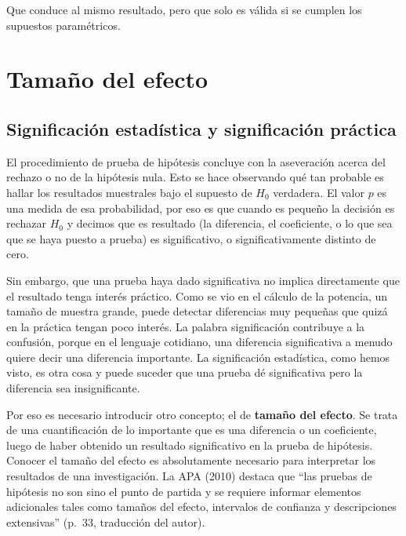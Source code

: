 \documentclass[]{book}
\begin{document}
Que conduce al mismo resultado, pero que solo es válida si se cumplen los supuestos paramétricos.

\hypertarget{tamauxf1o-del-efecto}{%
\chapter{Tamaño del efecto}\label{tamauxf1o-del-efecto}}

\hypertarget{significaciuxf3n-estaduxedstica-y-significaciuxf3n-pruxe1ctica}{%
\section{Significación estadística y significación práctica}\label{significaciuxf3n-estaduxedstica-y-significaciuxf3n-pruxe1ctica}}

El procedimiento de prueba de hipótesis concluye con la aseveración
acerca del rechazo o no de la hipótesis nula. Esto se hace observando
qué tan probable es hallar los resultados muestrales bajo el supuesto de
\(H_0\) verdadera. El valor \(p\) es una medida de esa probabilidad, por eso es
que cuando es pequeño la decisión es rechazar \(H_0\) y decimos que es
resultado (la diferencia, el coeficiente, o lo que sea que se haya
puesto a prueba) es significativo, o significativamente distinto de
cero.

Sin embargo, que una prueba haya dado significativa no implica
directamente que el resultado tenga interés práctico. Como se vio en el
cálculo de la potencia, un tamaño de muestra grande, puede detectar
diferencias muy pequeñas que quizá en la práctica tengan poco interés.
La palabra significación contribuye a la confusión, porque en el
lenguaje cotidiano, una diferencia significativa a menudo quiere decir
una diferencia importante. La significación estadística, como hemos
visto, es otra cosa y puede suceder que una prueba dé significativa pero
la diferencia sea insignificante.

Por eso es necesario introducir otro concepto; el de \textbf{tamaño del efecto}. Se trata de una cuantificación de lo importante que es una
diferencia o un coeficiente, luego de haber obtenido un resultado
significativo en la prueba de hipótesis. Conocer el tamaño del efecto es
absolutamente necesario para interpretar los resultados de una
investigación. La APA (2010) destaca que ``las pruebas de hipótesis no son sino el punto de partida y se requiere informar elementos
adicionales tales como tamaños del efecto, intervalos de confianza y
descripciones extensivas'' (p.~33, traducción del autor).
\end{document}

